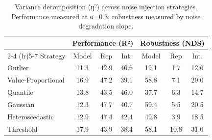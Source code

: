 \begin{table}[htbp]
\centering
\caption{Variance decomposition (η²) across noise injection strategies. Performance measured at σ=0.3; robustness measured by noise degradation slope.}
\label{tab:anova_strategies}
\begin{tabular}{lcccccc}
\toprule
 & \multicolumn{3}{c}{Performance (R²)} & \multicolumn{3}{c}{Robustness (NDS)} \\
\cmidrule(lr){2-4} \cmidrule(lr){5-7}
Strategy & Model & Rep & Int. & Model & Rep & Int. \\
\midrule
Outlier & 11.3 & 42.9 & 46.6 & 19.1 & 1.7 & 12.6 \\
Value-Proportional & 16.9 & 47.2 & 39.1 & 58.8 & 7.1 & 29.0 \\
Quantile & 13.8 & 43.5 & 46.0 & 37.7 & 6.3 & 14.7 \\
Gaussian & 12.3 & 47.7 & 40.7 & 59.4 & 5.5 & 20.5 \\
Heteroscedastic & 12.9 & 47.4 & 42.4 & 49.8 & 3.9 & 18.5 \\
Threshold & 17.9 & 43.9 & 38.4 & 58.1 & 10.8 & 31.0 \\
\bottomrule
\end{tabular}
\end{table}
